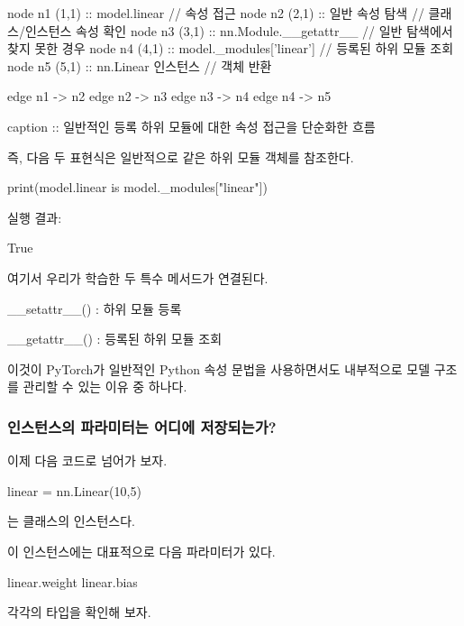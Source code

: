 \begin{dhkgraph}[uniform]
node n1 (1,1) :: model.linear // 속성 접근
node n2 (2,1) :: 일반 속성 탐색 // 클래스/인스턴스 속성 확인
node n3 (3,1) :: nn.Module.__getattr__ // 일반 탐색에서 찾지 못한 경우
node n4 (4,1) :: model._modules['linear'] // 등록된 하위 모듈 조회
node n5 (5,1) :: nn.Linear 인스턴스 // 객체 반환

edge n1 -> n2
edge n2 -> n3
edge n3 -> n4
edge n4 -> n5

caption :: 일반적인 등록 하위 모듈에 대한 속성 접근을 단순화한 흐름
\end{dhkgraph}

즉, 다음 두 표현식은 일반적으로 같은 하위 모듈 객체를 참조한다.

\begin{dhkcode}
print(model.linear is model._modules["linear"])
\end{dhkcode}

실행 결과:

\begin{dhkzsh}
True
\end{dhkzsh}

여기서 우리가 학습한 두 특수 메서드가 연결된다.

\begin{dhksmry}
    __setattr__() : 하위 모듈 등록

    __getattr__() : 등록된 하위 모듈 조회
\end{dhksmry}

이것이 PyTorch가 일반적인 Python 속성 문법을 사용하면서도 내부적으로 모델 구조를 관리할 수 있는 이유 중 하나다.

\subsubsection{ 인스턴스의 파라미터는 어디에 저장되는가?}

이제 다음 코드로 넘어가 보자.

\begin{dhkcode}
linear = nn.Linear(10,5)
\end{dhkcode}

는  클래스의 인스턴스다.

이 인스턴스에는 대표적으로 다음 파라미터가 있다.

\begin{dhkcode}
linear.weight
linear.bias
\end{dhkcode}

각각의 타입을 확인해 보자.

